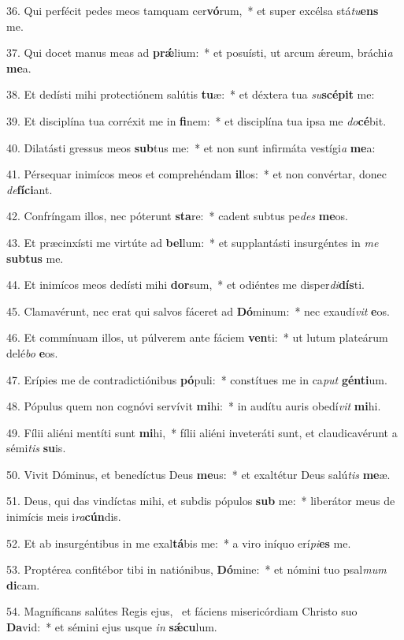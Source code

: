 36. Qui perfécit pedes meos tamquam cer\textbf{vó}rum,~*  et super excélsa stá\textit{tu}\textbf{ens} me.\

37. Qui docet manus meas ad \textbf{prǽ}lium:~*  et posuísti, ut arcum ǽreum, bráchi\textit{a} \textbf{me}a.\

38. Et dedísti mihi protectiónem salútis \textbf{tu}æ:~*  et déxtera tua \textit{su}\textbf{scé}\textbf{pit} me:\

39. Et disciplína tua corréxit me in \textbf{fi}nem:~*  et disciplína tua ipsa me \textit{do}\textbf{cé}bit.\

40. Dilatásti gressus meos \textbf{sub}tus me:~*  et non sunt infirmáta vestígi\textit{a} \textbf{me}a:\

41. Pérsequar inimícos meos et comprehéndam \textbf{il}los:~*  et non convértar, donec \textit{de}\textbf{fí}\textbf{ci}ant.\

42. Confríngam illos, nec póterunt \textbf{sta}re:~*  cadent subtus pe\textit{des} \textbf{me}os.\

43. Et præcinxísti me virtúte ad \textbf{bel}lum:~*  et supplantásti insurgéntes in \textit{me} \textbf{sub}\textbf{tus} me.\

44. Et inimícos meos dedísti mihi \textbf{dor}sum,~*  et odiéntes me disper\textit{di}\textbf{dís}ti.\

45. Clamavérunt, nec erat qui salvos fáceret ad \textbf{Dó}minum:~*  nec exaudí\textit{vit} \textbf{e}os.\

46. Et commínuam illos, ut púlverem ante fáciem \textbf{ven}ti:~*  ut lutum plateárum delé\textit{bo} \textbf{e}os.\

47. Erípies me de contradictiónibus \textbf{pó}puli:~*  constítues me in ca\textit{put} \textbf{gén}\textbf{ti}um.\

48. Pópulus quem non cognóvi servívit \textbf{mi}hi:~*  in audítu auris obedí\textit{vit} \textbf{mi}hi.\

49. Fílii aliéni mentíti sunt \textbf{mi}hi,~*  fílii aliéni inveteráti sunt, et claudicavérunt a sémi\textit{tis} \textbf{su}is.\

50. Vivit Dóminus, et benedíctus Deus \textbf{me}us:~*  et exaltétur Deus salú\textit{tis} \textbf{me}æ.\

51. Deus, qui das vindíctas mihi, et subdis pópulos \textbf{sub} me:~*  liberátor meus de inimícis meis i\textit{ra}\textbf{cún}dis.\

52. Et ab insurgéntibus in me exal\textbf{tá}bis me:~*  a viro iníquo erí\textit{pi}\textbf{es} me.\

53. Proptérea confitébor tibi in natiónibus, \textbf{Dó}mine:~*  et nómini tuo psal\textit{mum} \textbf{di}cam.\

54. Magníficans salútes Regis ejus, \dag\  et fáciens misericórdiam Christo suo \textbf{Da}vid:~*  et sémini ejus usque \textit{in} \textbf{sǽ}\textbf{cu}lum.\

